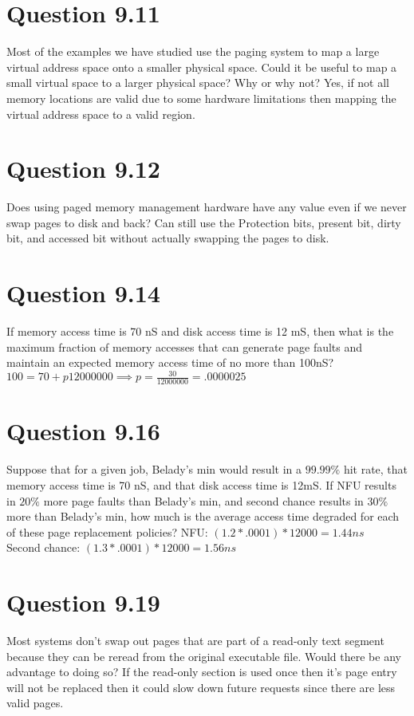 \documentclass{article}
\begin{document}
\section*{Question 9.11}
Most of the examples we have studied use the paging system to map a large virtual address space onto a smaller physical space.
Could it be useful to map a small virtual space to a larger physical space?
Why or why not?
\newline
\newline
Yes, if not all memory locations are valid due to some hardware limitations then mapping the virtual address space to a valid region.

\section*{Question 9.12}
Does using paged memory management hardware have any value even if we never swap pages to disk and back?
Can still use the Protection bits, present bit, dirty bit, and accessed bit without actually swapping the pages to disk.

\section*{Question 9.14}
If memory access time is 70 nS and disk access time is 12 mS, then what is the maximum fraction of memory accesses that can generate page faults and maintain an expected memory access time of no more than 100nS?
$100 = 70 + p12000000 \implies p = \frac{30}{12000000} = .0000025$

\section*{Question 9.16}
Suppose that for a given job, Belady's min would result in a $99.99\%$ hit rate, that memory access time is 70 nS, and that disk access time is 12mS.
If NFU results in $20\%$ more page faults than Belady's min, and second chance results in $30\%$ more than Belady's min, how much is the average access time degraded for each of these page replacement policies?
\newline
\newline
NFU: $(1.2*.0001)*12000 = 1.44ns$ \\
Second chance: $(1.3*.0001)*12000 = 1.56ns$


\section*{Question 9.19}
Most systems don't swap out pages that are part of a read-only text segment because they can be reread from the original executable file.
Would there be any advantage to doing so?
\newline
\newline
If the read-only section is used once then it's page entry will not be replaced then it could slow down future requests since there are less valid pages.
\end{document}
